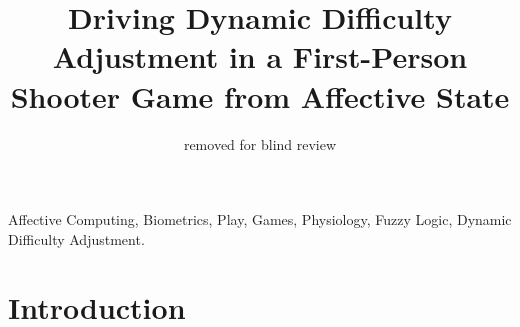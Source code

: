 \documentclass[conference]{IEEEtran}
\begin{document}

\title{Driving Dynamic Difficulty Adjustment in a First-Person Shooter Game from Affective State}

\author{\IEEEauthorblockN
{removed for blind review}
}

\maketitle


\begin{abstract}
\label{sec:abs}
\end{abstract}

\begin{IEEEkeywords}
Affective Computing, Biometrics, Play, Games, Physiology, Fuzzy Logic, Dynamic Difficulty Adjustment.
\end{IEEEkeywords}

\IEEEpeerreviewmaketitle


\section{Introduction}
\label{sec:intro}
\end{document}
